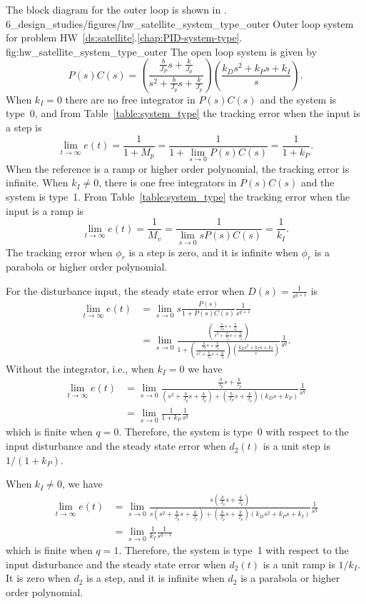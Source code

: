 The block diagram for the outer loop is shown in .
	{6_design_studies/figures/hw_satellite_system_type_outer}
	{Outer loop system for problem HW~\ref{ds:satellite}.\ref{chap:PID-system-type}.}
	{fig:hw_satellite_system_type_outer}
The open loop system is given by
\[
P(s)C(s) = \left(\frac{\frac{b}{J_P}s+\frac{k}{J_p}}{s^2+\frac{b}{J_p}s+\frac{k}{J_p}}\right)\left(\frac{k_Ds^2+k_Ps+k_I}{s}\right).
\]
When $k_I=0$ there are no free integrator in $P(s)C(s)$ and the system is type~0, and from Table~\ref{table:system_type} the tracking error when the input is a step is \[
\lim_{t\to\infty}e(t) = \frac{1}{1+M_p} = \frac{1}{1+\lim_{s\to 0} P(s)C(s)} = \frac{1}{1+k_P}.
\]
When the reference is a ramp or higher order polynomial, the tracking error is infinite.
When $k_I\neq 0$, there is one free integrators in $P(s)C(s)$ and the system is type~1.  From Table~\ref{table:system_type} the tracking error when the input is a ramp is 
\[
\lim_{t\to\infty}e(t) = \frac{1}{M_v} = \frac{1}{\lim_{s\to 0} sP(s)C(s)} = \frac{1}{k_I}.
\]
The tracking error when $\phi_r$ is a step is zero, and it is infinite when $\phi_r$ is a parabola or higher order polynomial.

For the disturbance input, the steady state error when $D(s) = \frac{1}{s^{q+1}}$ is
\begin{align*}
\lim_{t\to\infty}e(t) &= \lim_{s\to 0}s\frac{P(s)}{1+P(s)C(s)}\frac{1}{s^{q+1}} \\
&= \lim_{s\to 0} \frac{\left(\frac{\frac{b}{J_P}s+\frac{k}{J_p}}{s^2+\frac{b}{J_p}s+\frac{k}{J_p}}\right)}{1+\left(\frac{\frac{b}{J_P}s+\frac{k}{J_p}}{s^2+\frac{b}{J_p}s+\frac{k}{J_p}}\right)\left(\frac{k_Ds^2+k_Ps+k_I}{s}\right)}\frac{1}{s^q}.
\end{align*}
Without the integrator, i.e., when $k_I=0$ we have
\begin{align*}
\lim_{t\to\infty}e(t) &= \lim_{s\to 0} \frac{\frac{b}{J_p}s+\frac{k}{J_p}}{(s^2+\frac{b}{J_p}s+\frac{k}{J_p})+(\frac{b}{J_P}s+\frac{k}{J_p})(k_Ds+k_P)}\frac{1}{s^q} \\
&= \lim_{s\to 0} \frac{1}{1+k_P}\frac{1}{s^q}
\end{align*}
which is finite when $q=0$.  Therefore, the system is type~0 with respect to the input disturbance and the steady state error when $d_2(t)$ is a unit step is $1/(1+k_P)$.  

When $k_I\neq 0$, we have
\begin{align*}
\lim_{t\to\infty}e(t) &= \lim_{s\to 0} \frac{s\left(\frac{b}{J_p}s+\frac{k}{J_p}\right)}{s\left(s^2+\frac{b}{J_p}s+\frac{k}{J_p}\right)+\left(\frac{b}{J_p}s+\frac{k}{J_p}\right)\left(k_Ds^2+k_Ps+k_I\right)}\frac{1}{s^q} \\
&= \lim_{s\to 0} \frac{1}{k_I}\frac{1}{s^{q-1}}
\end{align*}
which is finite when $q=1$.  Therefore, the system is type~1 with respect to the input disturbance and the steady state error when $d_2(t)$ is a unit ramp is $1/k_I$.  It is zero when $d_2$ is a step, and it is infinite when $d_2$ is a parabola or higher order polynomial.

